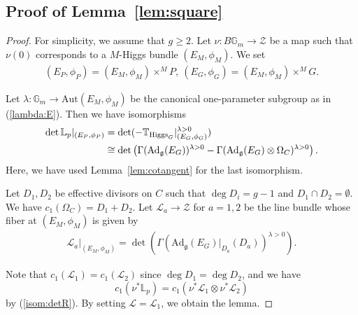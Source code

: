 \documentclass [11pt,oneside,a4paper,mathscr]{amsart}
\theoremstyle{definition}
\renewcommand{\geq}{\geqslant}
\newcommand{\zZ}{\mathcal{Z}}
\newcommand{\bgm}{B\mathbb{G}_m}
\newcommand{\fg}{\mathfrak{g}}
\newcommand{\Ad}{\mathrm{Ad}}
\newcommand{\Hig}{\mathrm{Higgs}}
\begin{document}
    \subsection{Proof of Lemma~\ref{lem:square}}\label{pf:lemsquare}
    \begin{proof}
For simplicity, we assume that $g\geq 2$. 
Let $\nu \colon \bgm \to \zZ$ be a map such that $\nu(0)$ corresponds to a 
$M$-Higgs bundle $(E_M, \phi_M)$. We set 
\begin{align*}(E_P, \phi_P)=(E_M, \phi_M)\times^M P, \ (E_G, \phi_G)=(E_M, \phi_M)\times^M G.
\end{align*}

Let 
$\lambda \colon \mathbb{G}_m \to \mathrm{Aut}(E_M, \phi_M)$ 
be the canonical one-parameter subgroup as in (\ref{lambda:E}).
Then we have isomorphisms
\begin{align}\notag
    \det \mathbb{L}_p|_{(E_P, \phi_P)}&=\det(-\mathbb{T}_{\Hig_G}|_{(E_G, \phi_G)}^{\lambda>0})\\
 \label{isom:detR}   &\cong \det\left( \Gamma(\Ad_{\fg}(E_G))^{\lambda>0}-\Gamma(\Ad_{\fg}(E_G)\otimes \Omega_C)^{\lambda>0}\right).
\end{align}
Here, we have used Lemma~\ref{lem:cotangent}
for the last isomorphism. 

Let $D_1, D_2$ be effective divisors on $C$ such that $\deg D_i=g-1$ and 
$D_1 \cap D_2=\emptyset$. We have $c_1(\Omega_C)=D_1+D_2$. 
Let $\mathcal{L}_a \to \zZ$ for $a=1, 2$ be the line bundle whose fiber at $(E_M, \phi_M)$ is given by 
\begin{align*}
    \mathcal{L}_a|_{(E_M, \phi_M)}=\det\left(
    \Gamma(\Ad_{\fg}(E_G)|_{D_a}(D_a))^{\lambda>0}\right). 
\end{align*}

Note that $c_1(\mathcal{L}_1)=c_1(\mathcal{L}_2)$ since 
$\deg D_1=\deg D_2$, and 
we have \[c_1(\nu^*\mathbb{L}_p)=c_1(\nu^*\mathcal{L}_1 \otimes \nu^*\mathcal{L}_2)\] 
by (\ref{isom:detR}). By setting $\mathcal{L}=\mathcal{L}_1$, we obtain 
the lemma. 
	\end{proof}
\end{document}
